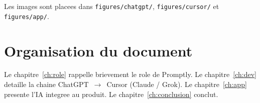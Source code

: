 Les images sont placees dans \texttt{figures/chatgpt/}, \texttt{figures/cursor/}
et \texttt{figures/app/}.

\section{Organisation du document}

Le chapitre~\ref{ch:role} rappelle brievement le role de Promptly.
Le chapitre~\ref{ch:dev} detaille la chaine ChatGPT~$\rightarrow$~Cursor
(Claude / Grok).
Le chapitre~\ref{ch:app} presente l'IA integree au produit.
Le chapitre~\ref{ch:conclusion} conclut.


